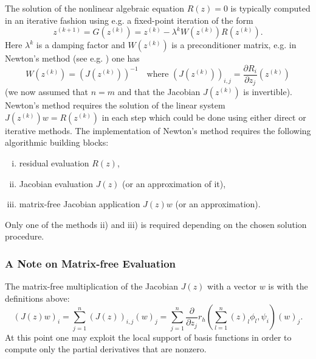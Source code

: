 \documentclass[a4paper,12pt]{article}
\begin{document}
The solution of the nonlinear algebraic equation $R(z)=0$ is typically computed
in an iterative fashion using e.g. a fixed-point iteration of the form
\begin{equation}
z^{(k+1)} = G(z^{(k)}) = z^{(k)} - \lambda^{k} W(z^{(k)}) R(z^{(k)}) .
\end{equation}
Here $\lambda^{k}$ is a damping factor
and $W(z^{(k)})$ is a preconditioner matrix, e.g. in Newton's method (see e.g. \cite{Braess}) one
has 
\begin{equation*}
W(z^{(k)}) = (J(z^{(k)}))^{-1} \quad \text{where $(J(z^{(k)}))_{i,j} = \frac{\partial R_i}{\partial z_j}
(z^{(k)})$}
\end{equation*}
(we now assumed that $n=m$ and that the Jacobian $J(z^{(k)})$ is invertible).
Newton's method requires the solution of the linear system $J(z^{(k)}) w = R(z^{(k)})$ in each
step which could be done using either direct or iterative methods.
The implementation of  Newton's method requires the following
algorithmic building blocks:
\begin{enumerate}[i)]
\item residual evaluation $R(z)$,
\item Jacobian evaluation $J(z)$ (or an approximation of it),
\item matrix-free Jacobian application $J(z) w$ (or an approximation).
\end{enumerate}
Only one of the methods ii) and iii) is required depending on the chosen
solution procedure.

\subsubsection*{A Note on Matrix-free Evaluation}

The matrix-free multiplication of the Jacobian $J(z)$ with a vector $w$ is with
the definitions above:
\begin{equation*}
(J(z) w)_i = \sum_{j=1}^n (J(z))_{i,j} (w)_j = \sum_{j=1}^n 
\frac{\partial}{\partial z_j} r_h\left(\sum_{l=1}^n (z)_l  \phi_l,\psi_i\right) (w)_j .
\end{equation*}
At this point one may exploit the local support of basis functions in order
to compute only the partial derivatives that are nonzero.
\end{document}
